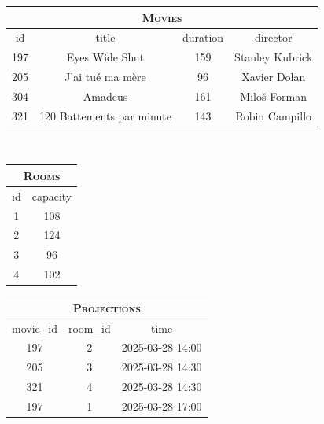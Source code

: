 {%
	\footnotesize%
	\begin{tabular}{cccc}
		\multicolumn{4}{c}{\textsc{Movies}} \\ \toprule
		id & title & duration & director \\ \midrule
		197 & Eyes Wide Shut & 159 & Stanley Kubrick \\ 
		205 & J'ai tué ma mère & 96 & Xavier Dolan \\
		304 & Amadeus & 161 & Miloš Forman \\
		321 & 120 Battements par minute & 143 & Robin Campillo \\ \bottomrule
	\end{tabular}
	\\\bigskip%
	\begin{tabular}{cc}
		\multicolumn{2}{c}{\textsc{Rooms}} \\ \toprule
		id & capacity  \\ \midrule
		1 & 108 \\
		2 & 124 \\
		3 & 96 \\
		4 & 102 \\ \bottomrule
	\end{tabular}%
	\hspace{1cm}%
	\begin{tabular}{ccc}
		\multicolumn{3}{c}{\textsc{Projections}} \\ \toprule
		movie\_id & room\_id & time \\ \midrule
		197 & 2 & 2025-03-28 14:00 \\
		205 & 3 & 2025-03-28 14:30 \\
		321 & 4 & 2025-03-28 14:30 \\
		197 & 1 & 2025-03-28 17:00 \\ \bottomrule
	\end{tabular}
}